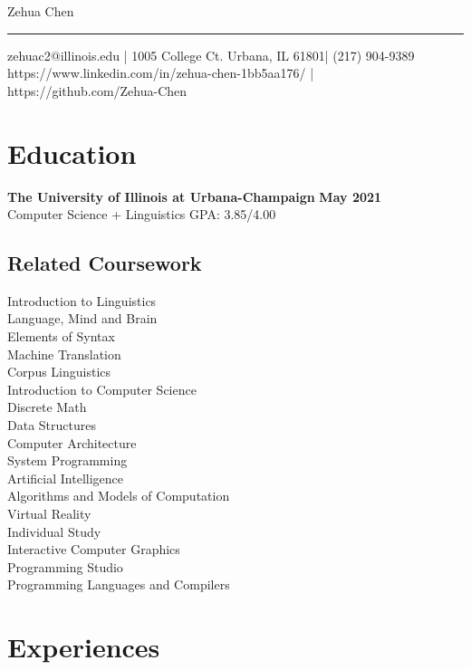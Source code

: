 \documentclass[10pt, letterpaper]{article}
\begin{document}
  \begin{center}
    {\LARGE Zehua Chen} \\
    \rule{\textwidth}{1pt}
    zehuac2@illinois.edu | 1005 College Ct. Urbana, IL 61801| (217) 904-9389 \\
    https://www.linkedin.com/in/zehua-chen-1bb5aa176/ | https://github.com/Zehua-Chen
  \end{center}

  \section{Education}
  {\large\textbf{The University of Illinois at Urbana-Champaign}} \hfill {\large\textbf{May 2021}} \\
  {Computer Science + Linguistics} \hfill {GPA: 3.85/4.00}

  \subsection{Related Coursework}

  \vspace{0pt}

  \begin{multicols}{3}
    Introduction to Linguistics \\
    Language, Mind and Brain \\
    Elements of Syntax \\
    Machine Translation \\
    Corpus Linguistics \\
    Introduction to Computer Science \\
    Discrete Math \\
    Data Structures \\
    Computer Architecture \\
    System Programming \\
    Artificial Intelligence \\
    Algorithms and Models of Computation \\
    Virtual Reality \\
    Individual Study \\
    Interactive Computer Graphics \\
    Programming Studio \\
    Programming Languages and Compilers
  \end{multicols}

  \section{Experiences}
  
  
  
  
\end{document}
